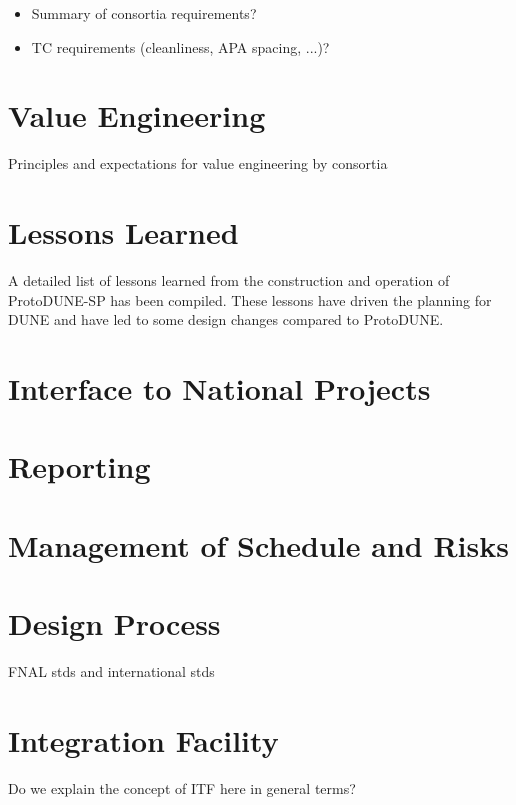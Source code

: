\begin{itemize}
 \item Summary of consortia requirements?
 \item TC requirements (cleanliness, APA spacing, ...)?
\end{itemize}

\section{Value Engineering}
\label{sec:fdsp-coord-ve}

Principles and expectations for value engineering by consortia

\section{Lessons Learned}
\label{sec:fdsp-coord-lessons}

A detailed list of lessons learned from the construction and operation
of ProtoDUNE-SP has been compiled. These lessons have driven the
planning for DUNE and have led to some design changes compared to
ProtoDUNE.

\section{Interface to National Projects}
\label{sec:fdsp-coord-national}


\section{Reporting}
\label{sec:fdsp-coord-reporting}


\section{Management of Schedule and Risks}
\label{sec:fdsp-coord-mgmt}


\section{Design Process}
\label{sec:fdsp-coord-designprocess}

FNAL stds and international stds

\section{Integration Facility}
\label{sec:fdsp-coord-itf}

Do we explain the concept of ITF here in general terms?

